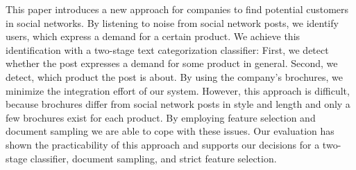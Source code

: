 
This paper introduces a new approach for companies to find potential customers in social networks.
By listening to noise from social network posts, we identify users, which express a demand for a certain product.
We achieve this identification with a two-stage text categorization classifier:
First, we detect whether the post  expresses a demand for some product in general.
Second, we detect, which product the post is about.
By using the company's brochures, we minimize the integration effort of our system.
However, this approach is difficult, because brochures differ from social network posts in style and length and only a few brochures exist for each product.
By employing feature selection and document sampling we are able to cope with these issues.
Our evaluation has shown the practicability of this approach and supports our decisions for a two-stage classifier, document sampling, and strict feature selection.
